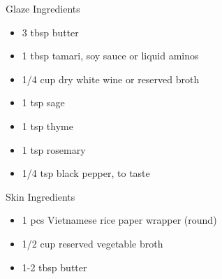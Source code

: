 \begin{scriptsize}
\begin{multicols}{2}
Glaze Ingredients
\begin{itemize}
    \item 3 tbsp butter
    \item 1 tbsp tamari, soy sauce or liquid aminos
    \item 1/4 cup dry white wine or reserved broth
    \item 1 tsp sage
    \item 1 tsp thyme
    \item 1 tsp rosemary
    \item 1/4 tsp black pepper, to taste
\end{itemize}

Skin Ingredients
\begin{itemize}
    \item 1 pcs Vietnamese rice paper wrapper (round)
    \item 1/2 cup reserved vegetable broth
    \item 1-2 tbsp butter
\end{itemize}
\end{multicols}
\end{scriptsize}

